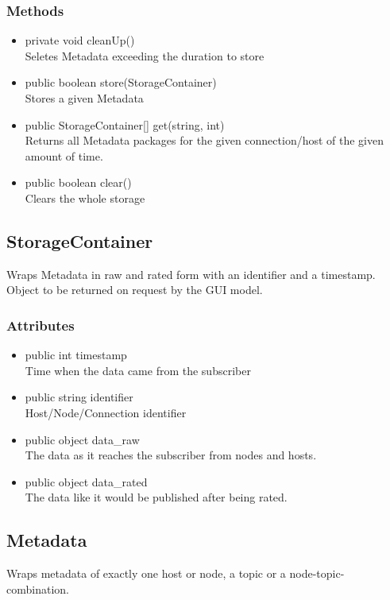 \subsubsection{Methods}
\begin{itemize}
	\item private  void cleanUp()\\
	Seletes Metadata exceeding the duration to store
	\item public  boolean store(StorageContainer)\\
	Stores a given Metadata
	\item public  StorageContainer[] get(string, int)\\
	Returns all Metadata packages for the given connection/host of the given amount of time.
	\item public  boolean clear()\\
	Clears the whole storage
\end{itemize}


\subsection{StorageContainer}
Wraps Metadata in raw and rated form with an identifier and a timestamp. Object to be returned on request by the GUI model.

\subsubsection{Attributes}
\begin{itemize}
	\item public  int timestamp\\
	Time when the data came from the subscriber
	\item public  string identifier\\
	Host/Node/Connection identifier
	\item public  object data\_raw\\
	The data as it reaches the subscriber from nodes and hosts.
	\item public  object data\_rated\\
	The data like it would be published after being rated.
\end{itemize}


\subsection{Metadata}
Wraps metadata of exactly one host or node, a topic or a node-topic-combination.

